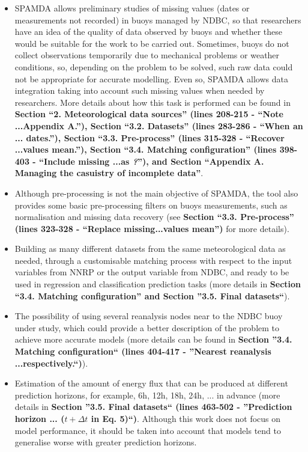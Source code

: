 \documentclass[a4paper,twoside,11pt]{article}
\begin{document}
{\begin{itemize}
	\item SPAMDA allows preliminary studies of missing values (dates or measurements not recorded) in buoys managed by NDBC, so that researchers have an idea of the quality of data observed by buoys and whether these would be suitable for the work to be carried out. Sometimes, buoys do not collect observations temporarily due to mechanical problems or weather conditions, so, depending on the problem to be solved, such raw data could not be appropriate for accurate modelling. Even so, SPAMDA allows data integration taking into account such missing values when needed by researchers. More details about how this task is performed can be found in \textbf{Section ``2. Meteorological data sources''  (lines 208-215 - ``Note ...Appendix A.''), Section ``3.2. Datasets'' (lines 283-286 - ``When an ... dates.''), Section ``3.3. Pre-process'' (lines 315-328 - ``Recover ...values mean.''), Section ``3.4. Matching configuration'' (lines 398-403  - ``Include missing ...as \guillemotleft\textit{?}\guillemotright''), and Section ``Appendix A. Managing the casuistry of incomplete data''}.

	\item Although pre-processing is not the main objective of SPAMDA, the tool also provides some basic pre-processing filters on buoys measurements, such as normalisation and missing data recovery (see \textbf{Section ``3.3. Pre-process'' (lines 323-328 - ``Replace missing...values mean'')} for more details).
	
	\item Building as many different datasets from the same meteorological data as needed, through a customisable matching process with respect to the input variables from NNRP or the output variable from NDBC, and ready to be used in regression and classification prediction tasks (more details in \textbf{Section ``3.4. Matching configuration'' and Section ''3.5. Final datasets``}).
	
	\item The possibility of using several reanalysis nodes near to the NDBC buoy under study, which could provide a better description of the problem to achieve more accurate models (more details can be found in \textbf{Section ''3.4. Matching configuration`` (lines 404-417 - ''Nearest reanalysis ...respectively.``)}).
	
	\item Estimation of the amount of energy flux that can be produced at different prediction horizons, for example, 6h, 12h, 18h, 24h, ... in advance (more details in \textbf{Section ''3.5. Final datasets`` (lines 463-502 - ''Prediction horizon ... (${t+\Delta t}$ in Eq. 5)``)}. Although this work does not focus on model performance, it should be taken into account that models tend to generalise worse with greater prediction horizons.


\end{itemize}}
\end{document}
